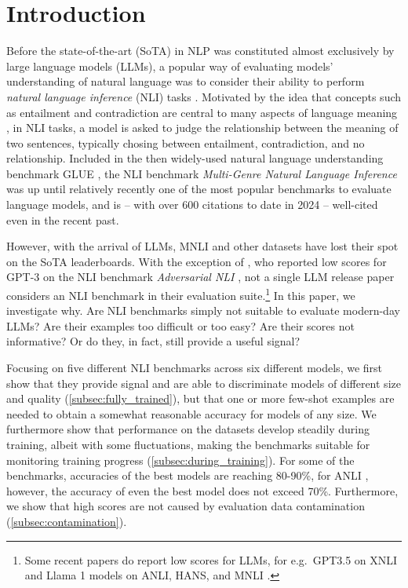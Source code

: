 \section{Introduction}

Before the state-of-the-art (SoTA) in NLP was constituted almost exclusively by large language models (LLMs), a popular way of evaluating models' understanding of natural language was to consider their ability to perform \emph{natural language inference} (NLI) tasks \citep[most famously,][]{bowman-etal-2015-large,williams-etal-2018-broad}.
Motivated by the idea that concepts such as entailment and contradiction are central to many aspects of language meaning \citep{bowman-etal-2015-large}, in NLI tasks, a model is asked to judge the relationship between the meaning of two sentences, typically chosing between entailment, contradiction, and no relationship.
Included in the then widely-used natural language understanding benchmark GLUE \citep{wang2019glue}, the NLI benchmark \emph{Multi-Genre Natural Language Inference}  \citep[MNLI,][]{williams-etal-2018-broad} was up until relatively recently one of the most popular benchmarks to evaluate language models, and is -- with over 600 citations to date in 2024 -- well-cited even in the recent past.

However, with the arrival of LLMs, MNLI and other datasets have lost their spot on the SoTA leaderboards.
With the exception of \citet{brown2020language},  who reported low scores for GPT-3 on the NLI benchmark \emph{Adversarial NLI} \citep[ANLI,][]{nie-etal-2020-adversarial}, not a single LLM release paper considers an NLI benchmark in their evaluation suite.\footnote{Some recent papers do report low scores for LLMs, for e.g.\ GPT3.5 on XNLI \citep{ohmer2024form,ohmer-etal-2023-separating} and Llama 1 models on ANLI, HANS, and MNLI \citep{mccoy-etal-2019-right,weber-etal-2023-mind}.}
In this paper, we investigate why.
Are NLI benchmarks simply not suitable to evaluate modern-day LLMs? 
Are their examples too difficult or too easy?
Are their scores not informative?
Or do they, in fact, still provide a useful signal?

Focusing on five different NLI benchmarks across six different models, we first show that they provide signal and are able to discriminate models of different size and quality (\cref{subsec:fully_trained}), but that one or more few-shot examples are needed to obtain a somewhat reasonable accuracy for models of any size.
We furthermore show that performance on the datasets develop steadily during training, albeit with some fluctuations, making the benchmarks suitable for monitoring training progress (\cref{subsec:during_training}).
For some of the benchmarks, accuracies of the best models are reaching 80-90\%, for ANLI \citep{nie-etal-2020-adversarial}, however, the accuracy of even the best model does not exceed 70\%.
Furthermore, we show that high scores are not caused by evaluation data contamination (\cref{subsec:contamination}).

